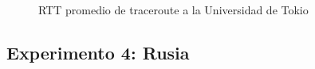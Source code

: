 \begin{figure}[H]
  \centering
  \caption{RTT promedio de traceroute a la Universidad de Tokio }
  \label{japonTTL}
\end{figure}


\newpage
\subsection{Experimento 4: Rusia}

\begin{landscape}

\end{landscape}

